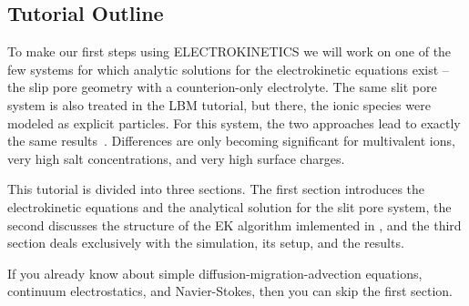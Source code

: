 \subsection*{Tutorial Outline}

To make our first steps using ELECTROKINETICS we will work on one of the few systems for which analytic solutions for the electrokinetic equations exist -- the slip pore geometry with a counterion-only electrolyte. The same slit pore system is also treated in the LBM tutorial, but there, the ionic species were modeled as explicit particles. For this system, the two approaches lead to exactly the same results~\cite{rempfer10a}. Differences are only becoming significant for multivalent ions, very high salt concentrations, and very high surface charges.

This tutorial is divided into three sections. The first section  introduces the electrokinetic equations and the analytical solution for the slit pore system, the second  discusses the structure of the EK algorithm imlemented in \ES{}, and the third section  deals exclusively with the simulation, its setup, and the results.

If you already know about simple diffusion-migration-advection equations, continuum electrostatics, and Navier-Stokes, then you can skip the first section.

\pagebreak
